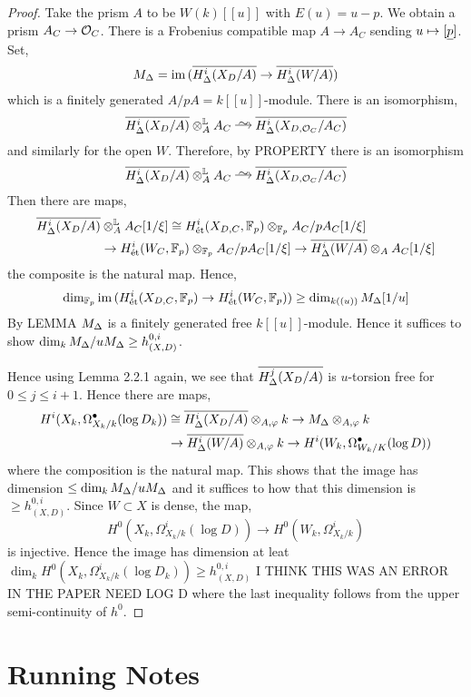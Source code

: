\documentclass[12pt]{article}
\begin{document}
\begin{proof}
Take the prism $A$ to be $W(k)[[u]]$ with $E(u) = u - p$. We obtain a prism $A_C \to \mathcal{O}_C$. There is a Frobenius compatible map $A \to A_C$ sending $u \mapsto [\underline{p}]$. Set,
\[ M_{\Delta} = \operatorname{\mathrm{im}}{(\overline{H^i_{\Delta}(X_D/A)} \to \overline{H^i_{\Delta}(W/A)})} \]
which is a finitely generated $A / pA = k[[u]]$-module. There is an isomorphism,
\[ \ol{H^i_{\BDel}(X_D/A)} \ot_A^{\LL} A_C \iso \ol{H^i_{\BDel}(X_{D, \cO_C}/A_C)} \]
and similarly for the open $W$. Therefore, by {\color{red} PROPERTY} there is an isomorphism
\[ \ol{H^i_{\BDel}(X_D/A)} \ot_A^{\LL} A_C \iso \ol{H^i_{\BDel}(X_{D, \cO_C}/A_C)} \]
Then there are maps,
\begin{align*}
\overline{H^i_{\Delta}(X_D/A)} & \otimes_A^{\mathbb{L}} A_C [1/\xi] \cong H^i_{\text{\'{e}t}}(X_{D,C}, \mathbb{F}_p) \otimes_{\mathbb{F}_p} A_C / p A_C [1/\xi]
\\
& \to H^i_{\text{\'{e}t}}(W_C, \mathbb{F}_p) \otimes_{\mathbb{F}_p} A_C / p A_C[1/\xi] \to \overline{H^i_{\Delta}(W/A)} \otimes_A A_C[1/\xi] 
\end{align*}
the composite is the natural map. Hence,
\[ \dim_{\mathbb{F}_p} \operatorname{\mathrm{im}}{(H^i_{\text{\'{e}t}}(X_{D,C}, \mathbb{F}_p) \to H^i_{\text{\'{e}t}}(W_C, \mathbb{F}_p))} \ge \dim_{k((u))} M_{\Delta}[1/u] \]
By {\color{red} LEMMA} $M_{\Delta}$ is a finitely generated free $k[[u]]$-module. Hence it suffices to show $\dim_k M_{\Delta} / u M_{\Delta} \ge h^{0,i}_{(X,D)}$. 


Hence using Lemma 2.2.1 again, we see that $\overline{H^j_{\Delta}(X_D/A)}$ is $u$-torsion free for $0 \le j \le i + 1$. Hence there are maps,
\begin{align*}
H^i(X_k, \Omega^\bullet_{X_k/k}(\log{D_k})) & \cong \overline{H^i_{\Delta}(X_D/A)} \otimes_{A, \varphi} k \to M_{\Delta} \otimes_{A, \varphi} k 
\\
& \to \overline{H^i_{\Delta}(W/A)} \otimes_{A, \varphi} k \to H^i(W_k, \Omega^\bullet_{W_k/K}(\log{D})) 
\end{align*}
where the composition is the natural map. This shows that the image has dimension $\le \dim_k M_{\Delta} / u M_{\Delta}$ and it suffices to how that this dimension is $\ge h^{0,i}_{(X,D)}$. Since $W \subset X$ is dense, the map,
\[ H^0(X_k, \Omega^i_{X_k/k}(\log{D})) \to H^0(W_k, \Omega^i_{X_k/k}) \]
is injective. Hence the image has dimension at leat $\dim_k H^0(X_k, \Omega^i_{X_k/k}(\log{D_k})) \ge h^{0,i}_{(X,D)}$ {\color{red} I THINK THIS WAS AN ERROR IN THE PAPER NEED LOG D} where the last inequality follows from the upper semi-continuity of $h^0$. 
\end{proof}


\section{Running Notes}
\end{document}
